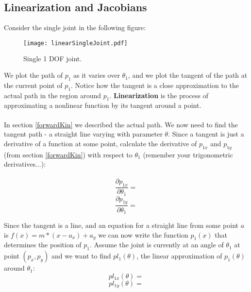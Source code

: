 \documentclass[]{article}
\begin{document}
\subsection{Linearization and Jacobians}\label{linearization}

Consider the single joint in the following figure:
\begin{figure}[htp]
    \centering
    \texttt{[image: linearSingleJoint.pdf]}
    \label{linearSingleJoint}
    \caption{Single 1 DOF joint.}
\end{figure}

We plot the path of $p_1$ as it varies over $\theta_1$, and we plot the tangent of the path at the current point of $p_1$. Notice how the tangent is a close approximation to the actual path in the region around $p_1$. \textbf{Linearization} is the process of approximating a nonlinear function by its tangent around a point. 
\\
\\
In section \ref{forwardKin} we described the actual path. We now need to find the tangent path - a straight line varying with parameter $\theta$. Since a tangent is just a derivative of a function at some point, calculate the derivative of $p_{1x}$ and $p_{1y}$ (from section \ref{forwardKin}) with respect to $\theta_1$ (remember your trigonometric derivatives...):
\\
\\
\begin{equation*}
    \frac{\partial p_{1x}}{\partial \theta_1} = %
\end{equation*}
\vspace{0.1cm}
\begin{equation*}
    \frac{\partial p_{1y}}{\partial \theta_1} = %
\end{equation*}
\vspace{0.1cm}

Since the tangent is a line, and an equation for a straight line from some point $a$ is $f(x) = m*(x-a_x) + a_y$ we can now write the function $p_{1}(x)$ that determines the position of $p_1$. Assume the joint is currently at an angle of $\theta_1$ at point $(p_x,p_y)$ and we want to find $pl_{1}(\theta)$, the linear approximation of $p_1(\theta)$ around $\theta_1$:
\begin{equation*}
    pl_{1x}(\theta) = %
\end{equation*}
\vspace{0.1cm}
\begin{equation*}
    pl_{1y}(\theta) = %
\end{equation*}
\pagebreak
\end{document}
